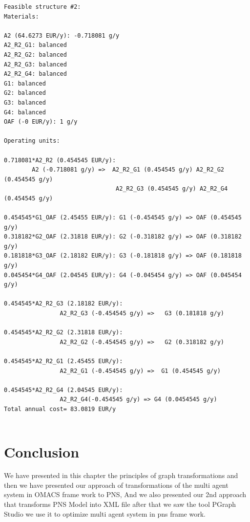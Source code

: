 \begin{lstlisting}[caption=Part from Graph.out]
Feasible structure #2:
Materials:

A2 (64.6273 EUR/y): -0.718081 g/y
A2_R2_G1: balanced
A2_R2_G2: balanced
A2_R2_G3: balanced
A2_R2_G4: balanced
G1: balanced
G2: balanced
G3: balanced
G4: balanced
OAF (-0 EUR/y): 1 g/y

Operating units:

0.718081*A2_R2 (0.454545 EUR/y): 
		A2 (-0.718081 g/y) =>  A2_R2_G1 (0.454545 g/y) A2_R2_G2 (0.454545 g/y) 
								A2_R2_G3 (0.454545 g/y) A2_R2_G4 (0.454545 g/y) 
								
0.454545*G1_OAF (2.45455 EUR/y): G1 (-0.454545 g/y) => OAF (0.454545 g/y) 
0.318182*G2_OAF (2.31818 EUR/y): G2 (-0.318182 g/y) => OAF (0.318182 g/y) 
0.181818*G3_OAF (2.18182 EUR/y): G3 (-0.181818 g/y) => OAF (0.181818 g/y) 
0.045454*G4_OAF (2.04545 EUR/y): G4 (-0.045454 g/y) => OAF (0.045454 g/y) 

0.454545*A2_R2_G3 (2.18182 EUR/y): 
				A2_R2_G3 (-0.454545 g/y) =>   G3 (0.181818 g/y) 
				
0.454545*A2_R2_G2 (2.31818 EUR/y):
				A2_R2_G2 (-0.454545 g/y) =>   G2 (0.318182 g/y) 
				
0.454545*A2_R2_G1 (2.45455 EUR/y): 
				A2_R2_G1 (-0.454545 g/y) =>  G1 (0.454545 g/y) 
				
0.454545*A2_R2_G4 (2.04545 EUR/y): 
				A2_R2_G4(-0.454545 g/y) => G4 (0.0454545 g/y) 
Total annual cost= 83.0819 EUR/y


\end{lstlisting}

\section{Conclusion}
We have presented in this chapter the principles of graph transformations and then we have presented our approach of transformations of the multi agent system in OMACS frame work to PNS, And we also presented our 2nd
approach that transforms PNS Model  into XML file after that we saw the tool
PGraph Studio we use it to optimize multi agent system in pns frame work.

